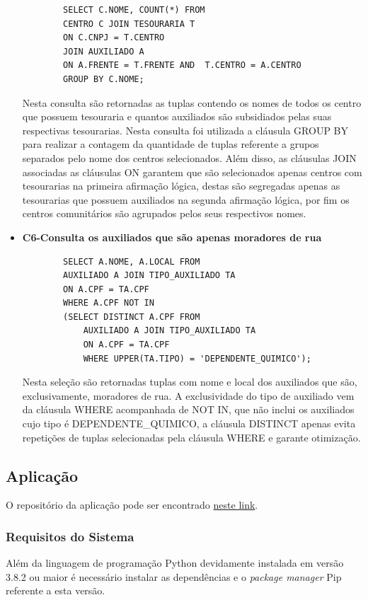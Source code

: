 \begin{itemize}
    \begin{lstlisting}
        SELECT C.NOME, COUNT(*) FROM
        CENTRO C JOIN TESOURARIA T
        ON C.CNPJ = T.CENTRO
        JOIN AUXILIADO A  
        ON A.FRENTE = T.FRENTE AND  T.CENTRO = A.CENTRO
        GROUP BY C.NOME;
    \end{lstlisting}

    Nesta consulta são retornadas as tuplas contendo os nomes de todos os centro que possuem tesouraria e quantos auxiliados são subsidiados pelas suas respectivas tesourarias. Nesta consulta foi utilizada a cláusula GROUP BY para realizar a contagem da quantidade de tuplas referente a grupos separados pelo nome dos centros selecionados. Além disso, as cláusulas JOIN associadas as cláusulas ON garantem que são selecionados apenas centros com tesourarias na primeira afirmação lógica, destas são segregadas apenas as tesourarias que possuem auxiliados na segunda afirmação lógica, por fim os centros comunitários são agrupados pelos seus respectivos nomes.

    \item \textbf{C6-Consulta os auxiliados que são apenas moradores de rua}

    \begin{lstlisting}
        SELECT A.NOME, A.LOCAL FROM
        AUXILIADO A JOIN TIPO_AUXILIADO TA
        ON A.CPF = TA.CPF
        WHERE A.CPF NOT IN
        (SELECT DISTINCT A.CPF FROM 
            AUXILIADO A JOIN TIPO_AUXILIADO TA
            ON A.CPF = TA.CPF
            WHERE UPPER(TA.TIPO) = 'DEPENDENTE_QUIMICO');
    \end{lstlisting}

    Nesta seleção são retornadas tuplas com nome e local dos auxiliados que são, exclusivamente, moradores de rua. A exclusividade do tipo de auxiliado vem da cláusula WHERE acompanhada de NOT IN, que não inclui os auxiliados cujo tipo é DEPENDENTE\_QUIMICO, a cláusula DISTINCT apenas evita repetições de tuplas selecionadas pela cláusula WHERE e garante otimização.
    
\end{itemize}
\subsection{Aplicação}

O repositório da aplicação pode ser encontrado \href{https://github.com/Franreno/AuxilioDepQuim}{neste link}.

\subsubsection{Requisitos do Sistema}
Além da linguagem de programação Python devidamente instalada em versão 3.8.2 ou maior é necessário instalar as dependências e o \textit{package manager} Pip referente a esta versão.

